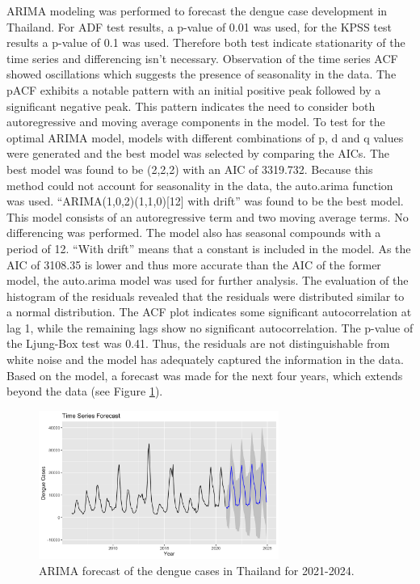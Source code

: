 	ARIMA modeling was performed to forecast the dengue case development in Thailand. For ADF test results, a p-value of 0.01 was used, for the KPSS test results a p-value of 0.1 was used. Therefore both test indicate stationarity of the time series and differencing isn’t necessary. Observation of the time series ACF showed oscillations which suggests the presence of seasonality in the data. The pACF exhibits a notable pattern with an initial positive peak followed by a significant negative peak. This pattern indicates the need to consider both autoregressive and moving average components in the model.
	To test for the optimal ARIMA model, models with different combinations of p, d and q values were generated and the best model was selected by comparing the AICs. The best model was found to be (2,2,2) with an AIC of 3319.732. Because this method could not account for seasonality in the data, the auto.arima function was used. “ARIMA(1,0,2)(1,1,0)[12] with drift” was found to be the best model. This model consists of an autoregressive term and two moving average terms. No differencing was performed. The model also has seasonal compounds with a period of 12. “With drift” means that a constant is included in the model. As the AIC of 3108.35 is lower and thus more accurate than the AIC of the former model, the auto.arima model was used for further analysis. 
	The evaluation of the histogram of the residuals revealed that the residuals were distributed similar to a normal distribution. The ACF plot indicates some significant autocorrelation at lag 1, while the remaining lags show no significant autocorrelation. The p-value of the Ljung-Box test was 0.41. Thus, the residuals are not distinguishable from white noise and the model has adequately captured the information in the data. 
	Based on the model, a forecast was made for the next four years, which extends beyond the data (see Figure \ref{fig:Auto_ARIMA_forecast}). 
	
		\begin{figure}[hbpt] 
		\centering
		\includegraphics[width=0.7\textwidth]{fig/Auto_ARIMA_forecast.png}
		\caption{ARIMA forecast of the dengue cases in Thailand for 2021-2024.}
		\label{fig:Auto_ARIMA_forecast}
	\end{figure}
 
